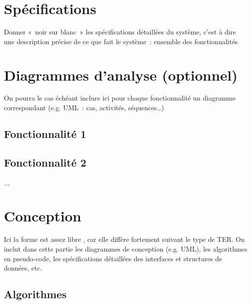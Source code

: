 \documentclass[a4paper,12pt]{article}
\begin{document}
  \begin{titlepage}
   \def\titletype{Rapport de tests}
   
  \end{titlepage}

  
  \clearpage

  \tableofcontents
  

  \clearpage
  
  \renewcommand{\labelitemi}{$\bullet$}
  \renewcommand{\labelitemii}{$\circ$}
  \renewcommand{\labelitemiii}{$\diamond$}
  \renewcommand{\labelitemiv}{$\ast$}
  
  \section{Spécifications}
  Donner « noir sur blanc » les spécifications détaillées du système, 
  c’est à dire une description précise de ce que fait le système : ensemble des fonctionnalités

 
 
 
 \section{Diagrammes d’analyse (optionnel)}
  On pourra le cas échéant inclure ici pour chaque fonctionnalité un diagramme correspondant 
  (e.g. UML : cas, activités, séquences…)
    \subsection{Fonctionnalité 1}
    \subsection{Fonctionnalité 2}
    ...
  
  
  
  \section{Conception}
  Ici la forme est assez libre , car elle diffère fortement suivant le type de TER.
  On inclut dans cette partie les diagrammes de conception (e.g. UML), les algorithmes 
  en pseudo-code, les spécifications détaillées des interfaces et structures de données, etc.
  
  \subsection{Algorithmes}
  
  



\end{document}
